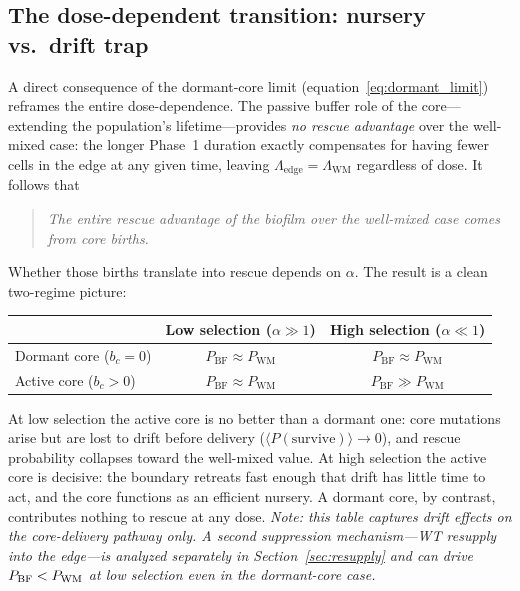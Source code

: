 \documentclass[12pt]{article}
\newcommand{\bCore}{b_c}
\begin{document}
\subsection{The dose-dependent transition: nursery vs.\ drift trap}
\label{sec:transition}

A direct consequence of the dormant-core limit
(equation~\eqref{eq:dormant_limit}) reframes the entire dose-dependence.
The passive buffer role of the core---extending the population's
lifetime---provides \emph{no rescue advantage} over the well-mixed case:
the longer Phase~1 duration exactly compensates for having fewer cells in
the edge at any given time, leaving $\Lambda_{\text{edge}} = \Lambda_{\text{WM}}$
regardless of dose. It follows that

\begin{quote}
\textit{The entire rescue advantage of the biofilm over the well-mixed
case comes from core births.}
\end{quote}

Whether those births translate into rescue depends on $\alpha$.
The result is a clean two-regime picture:

\begin{center}
\renewcommand{\arraystretch}{1.6}
\begin{tabular}{lcc}
\toprule
 & Low selection ($\alpha \gg 1$) & High selection ($\alpha \ll 1$) \\
\midrule
Dormant core ($\bCore = 0$)
    & $P_{\text{BF}} \approx P_{\text{WM}}$
    & $P_{\text{BF}} \approx P_{\text{WM}}$ \\
Active core ($\bCore > 0$)
    & $P_{\text{BF}} \approx P_{\text{WM}}$
    & $P_{\text{BF}} \gg P_{\text{WM}}$ \\
\bottomrule
\end{tabular}
\end{center}

\noindent At low selection the active core is no better than a dormant
one: core mutations arise but are lost to drift before delivery
($\langle P(\text{survive})\rangle \to 0$), and rescue probability
collapses toward the well-mixed value. At high selection the active core
is decisive: the boundary retreats fast enough that drift has little time
to act, and the core functions as an efficient nursery. A dormant core,
by contrast, contributes nothing to rescue at any dose. \emph{Note: this
table captures drift effects on the core-delivery pathway only. A second
suppression mechanism---WT resupply into the edge---is analyzed
separately in Section~\ref{sec:resupply} and can drive
$P_{\rm BF} < P_{\rm WM}$ at low selection even in the dormant-core
case.}
\end{document}
